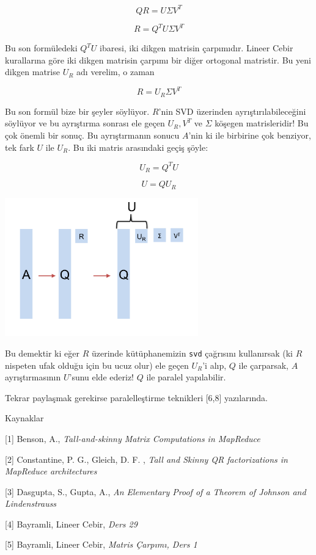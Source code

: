 \documentclass[12pt,fleqn]{article}\usepackage{../../common}
\begin{document}
$$ QR =  U \Sigma V^T $$

$$ R = Q^T U \Sigma V^T $$

Bu son formüledeki $Q^TU$ ibaresi, iki dikgen matrisin çarpımıdır. Lineer Cebir
kurallarına göre iki dikgen matrisin çarpımı bir diğer ortogonal matristir. Bu
yeni dikgen matrise $U_R$ adı verelim, o zaman

$$ R = U_R \Sigma V^T $$

Bu son formül bize bir şeyler söylüyor. $R$'nin SVD üzerinden
ayrıştırılabileceğini söylüyor ve bu ayrıştırma sonrası ele geçen $U_R,V^T$ ve
$\Sigma$ köşegen matrisleridir! Bu çok önemli bir sonuç.  Bu ayrıştırmanın
sonucu $A$'nin ki ile birbirine çok benziyor, tek fark $U$ ile $U_R$. Bu iki
matris arasındaki geçiş şöyle:

$$ U_R = Q^T U $$ 

$$ U = QU_R $$ 

\includegraphics[height=6cm]{ur.png}

Bu demektir ki eğer $R$ üzerinde kütüphanemizin \verb!svd!  çağrısını
kullanırsak (ki $R$ nispeten ufak olduğu için bu ucuz olur) ele geçen $U_R$'i
alıp, $Q$ ile çarparsak, $A$ ayrıştırmasının $U$'sunu elde ederiz! $Q$ ile
paralel yapılabilir.

Tekrar paylaşmak gerekirse paralelleştirme teknikleri [6,8] yazılarında.

Kaynaklar

[1] Benson, A., {\em Tall-and-skinny Matrix Computations in MapReduce}

[2] Constantine, P. G., Gleich, D. F. , {\em Tall and Skinny QR factorizations in MapReduce architectures}

[3] Dasgupta, S., Gupta, A., {\em An Elementary Proof of a Theorem of Johnson and Lindenstrauss}

[4] Bayramli, Lineer Cebir, {\em Ders 29}

[5] Bayramli, Lineer Cebir, {\em Matris Çarpımı, Ders 1}
\end{document}
